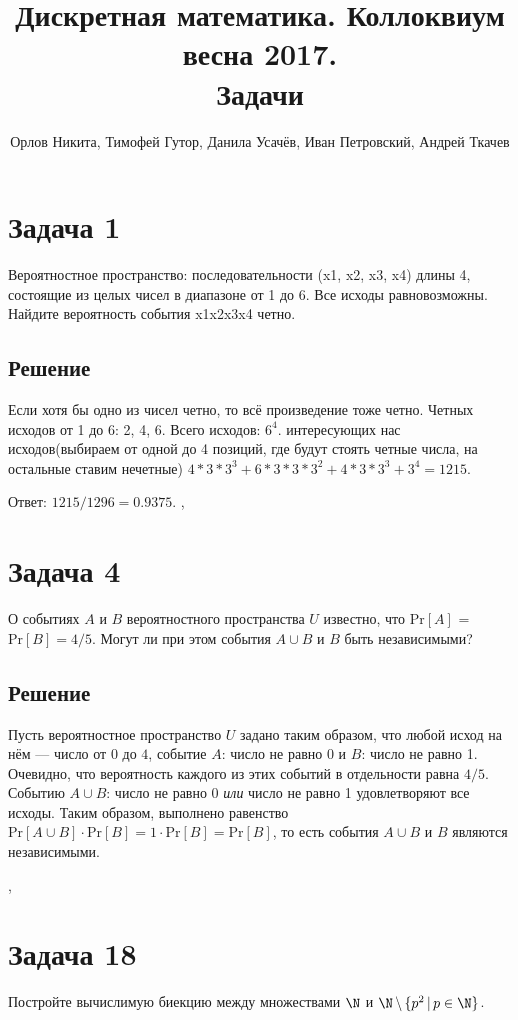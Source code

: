 \documentclass[a4paper,12pt]{article}
\newcommand {\gu} [1] {\guillemotleft#1\guillemotright}
\renewcommand{\Pr} {\text {Pr}}
\begin{document}
	\title{Дискретная математика. Коллоквиум весна 2017. \\ Задачи}
    \author{Орлов Никита, Тимофей Гутор, Данила Усачёв, Иван Петровский, Андрей Ткачев}
	\maketitle
	
	\section*{Задача 1}
    
    Вероятностное пространство: последовательности (x1, x2, x3, x4) длины 4, состоящие из целых чисел в диапазоне от 1 до 6. Все исходы равновозможны. Найдите вероятность события x1x2x3x4 четно.
    
    \subsection*{Решение}
    
    Если хотя бы одно из чисел четно, то всё произведение тоже четно. Четных исходов от 1 до 6: 2, 4, 6. Всего исходов: $6^4$. интересующих нас исходов(выбираем от одной до 4 позиций, где будут стоять четные числа, на остальные ставим нечетные) $4 * 3 * 3^3 + 6 * 3 * 3 * 3^2 + 4 * 3 * 3^3 + 3^4 = 1215. $
    
    Ответ: $1215/1296 = 0.9375$.
    \sep
	\section*{Задача 4}
	О событиях $A$ и $B$ вероятностного пространства $U$ известно, что $\Pr [A]$ = $\Pr [B] = 4/5$. Могут ли при этом события $A\cup B$ и $B$ быть независимыми?
	
	\subsection*{Решение}
	Пусть вероятностное пространство $U$ задано таким образом, что любой исход на нём --- число от $0$ до $4$, событие $A$: \gu{число не равно 0} и $B$: \gu{число не равно 1}. Очевидно, что вероятность каждого из этих событий в отдельности равна $4/5$. Событию $A\cup B$: \gu{число не равно 0 \textit{или} число не равно 1} удовлетворяют все исходы. Таким образом, выполнено равенство $\Pr [A\cup B]\cdot\Pr [B]=1\cdot\Pr [B] = \Pr[B]$, то есть события $A\cup B$ и $B$ являются независимыми.
	
	\sep
	\section*{Задача 18}
	Постройте вычислимую биекцию между множествами $\N$ и $\N\,\backslash\,\{p^2\,|\,p\in\N\}$.
\end{document}
